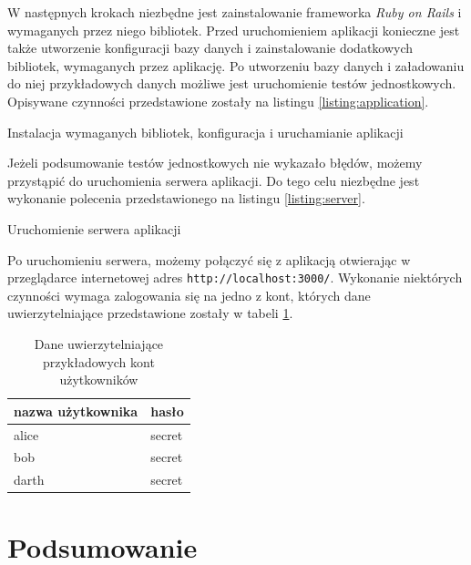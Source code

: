 \documentclass[a4paper,12pt]{article}
\begin{document}
W następnych krokach niezbędne jest zainstalowanie frameworka
\emph{Ruby on Rails} i wymaganych przez niego bibliotek. Przed
uruchomieniem aplikacji konieczne jest także utworzenie konfiguracji
bazy danych i zainstalowanie dodatkowych bibliotek, wymaganych przez
aplikację. Po utworzeniu bazy danych i załadowaniu do niej
przykładowych danych możliwe jest uruchomienie testów
jednostkowych. Opisywane czynności przedstawione zostały na listingu
\ref{listing:application}.

\begin{listing}
  
  \caption{Instalacja wymaganych bibliotek, konfiguracja i
    uruchamianie aplikacji}
  \label{listing:application}
\end{listing}

Jeżeli podsumowanie testów jednostkowych nie wykazało błędów, możemy
przystąpić do uruchomienia serwera aplikacji. Do tego celu niezbędne
jest wykonanie polecenia przedstawionego na listingu
\ref{listing:server}.

\begin{listing}
  
  \caption{Uruchomienie serwera aplikacji}
  \label{listing:server}
\end{listing}

Po uruchomieniu serwera, możemy połączyć się z aplikacją otwierając w
przeglądarce internetowej adres
\texttt{http://localhost:3000/}. Wykonanie niektórych czynności wymaga
zalogowania się na jedno z kont, których dane uwierzytelniające
przedstawione zostały w tabeli \ref{table:credentials}.

\begin{table}[ht]
  \begin{center}
    \begin{tabular}[center]{|l|l|}
      \hline
      \textbf{nazwa użytkownika} & \textbf{hasło} \\
      \hline
      alice & secret \\
      bob & secret \\
      darth & secret \\
      \hline
    \end{tabular}
  \end{center}
  \label{table:credentials}
  \caption{Dane uwierzytelniające przykładowych kont użytkowników}
\end{table}

\clearpage

\section{Podsumowanie}


\clearpage



\end{document}
